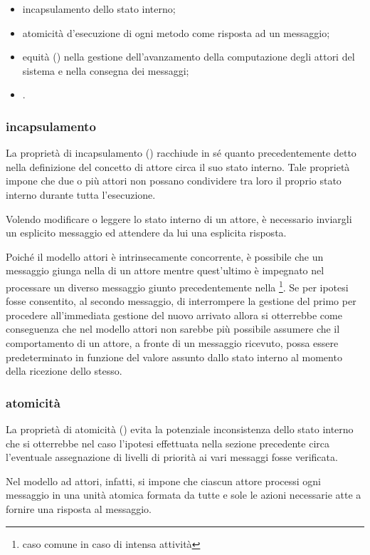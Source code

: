 \begin{itemize}
\item{incapsulamento dello stato interno;}
\item{atomicità d'esecuzione di ogni metodo come risposta ad un messaggio;}
\item{equità () nella gestione dell'avanzamento della computazione degli attori del sistema e nella consegna dei messaggi;}
\item{.}
\end{itemize}

\subsubsection*{incapsulamento}
La proprietà di incapsulamento () racchiude in sé quanto precedentemente detto nella definizione del concetto di attore circa il suo stato interno. Tale proprietà impone che due o più attori non possano condividere tra loro il proprio stato interno durante tutta l'esecuzione.

Volendo modificare o leggere lo stato interno di un attore, è necessario inviargli un esplicito messaggio ed attendere da lui una esplicita risposta.

Poiché il modello attori è intrinsecamente concorrente, è possibile che un messaggio giunga nella  di un attore mentre quest'ultimo è impegnato nel processare un diverso messaggio giunto precedentemente nella \footnote{caso comune in caso di intensa attività}. Se per ipotesi fosse consentito, al secondo messaggio, di interrompere la gestione del primo per procedere all'immediata gestione del nuovo arrivato allora si otterrebbe come conseguenza che nel modello attori non sarebbe più possibile assumere che il comportamento di un attore, a fronte di un messaggio ricevuto, possa essere predeterminato in funzione del valore assunto dallo stato interno al momento della ricezione dello stesso.

\subsubsection*{atomicità}
La proprietà di atomicità () evita la potenziale inconsistenza dello stato interno che si otterrebbe nel caso l'ipotesi effettuata nella sezione precedente circa l'eventuale assegnazione di livelli di priorità ai vari messaggi fosse verificata.

Nel modello ad attori, infatti, si impone che ciascun attore processi ogni messaggio in una unità atomica formata da tutte e sole le azioni necessarie atte a fornire una risposta al messaggio.

